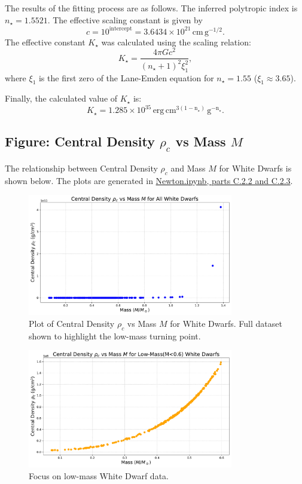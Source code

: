 \documentclass[12pt]{article}
\begin{document}
The results of the fitting process are as follows. The inferred polytropic index is \( n_\star = 1.5521 \). The effective scaling constant is given by
\[
c = 10^{\text{intercept}} = 3.6434 \times 10^{21} \, \mathrm{cm \, g^{-1/2}}.
\]
The effective constant \( K_\star \) was calculated using the scaling relation:
\[
K_\star = \frac{4 \pi G c^2}{(n_\star + 1)^2 \xi_1^2},
\]
where \( \xi_1 \) is the first zero of the Lane-Emden equation for \( n_\star = 1.55 \) (\( \xi_1 \approx 3.65 \)).

Finally, the calculated value of \( K_\star \) is:
\[
K_\star = 1.285 \times 10^{35} \, \mathrm{erg \, cm^{3(1-n_\star)} \, g^{-n_\star}}.
\]

\subsection{Figure: Central Density \(\rho_c\) vs Mass \(M\)}

The relationship between Central Density \(\rho_c\) and Mass \(M\) for White Dwarfs is shown below. The plots are generated in \href{Newton.ipynb}{Newton.ipynb, parts C.2.2 and C.2.3}.

\begin{figure}[H] %
    \centering
    \includegraphics[width=0.8\textwidth]{Newton_PartC2.2.pdf}
    \caption{Plot of Central Density \(\rho_c\) vs Mass \(M\) for White Dwarfs. Full dataset shown to highlight the low-mass turning point.}
    \label{fig:newton-partc2.2}
\end{figure}

\begin{figure}[H] %
    \centering
    \includegraphics[width=0.8\textwidth]{Newton_PartC2.3.pdf}
    \caption{Focus on low-mass White Dwarf data.}
    \label{fig:newton-partc2.3}
\end{figure}
\end{document}
